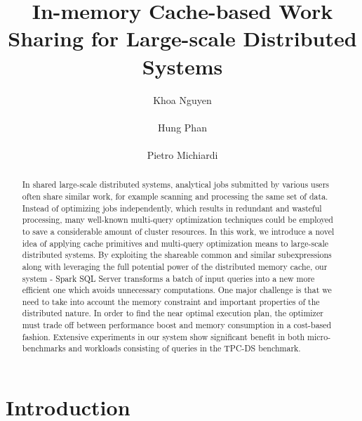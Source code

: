 \documentclass{acmsig}
\begin{document}
\title{In-memory Cache-based Work Sharing for Large-scale Distributed Systems}


\author{
\alignauthor
Khoa Nguyen\\
       \\
\alignauthor
Hung Phan\\
       \\
\alignauthor 
Pietro Michiardi
       \\
}
\maketitle

\begin{abstract}
In shared large-scale distributed systems, analytical jobs submitted by various users often share similar work, for example scanning and processing the same set of data. Instead of optimizing jobs independently, which results in redundant and wasteful processing, many well-known multi-query optimization techniques could be employed to save a considerable amount of cluster resources. In this work, we introduce a novel idea of applying cache primitives and multi-query optimization means to large-scale distributed systems. By exploiting the shareable common and similar subexpressions along with leveraging the full potential power of the distributed memory cache, our system - Spark SQL Server transforms a batch of input queries into a new more efficient one which avoids unnecessary computations. One major challenge is that we need to take into account the memory constraint and important properties of the distributed nature. In order to find the near optimal execution plan, the optimizer must trade off between performance boost and memory consumption in a cost-based fashion. Extensive experiments in our system show significant benefit in both micro-benchmarks and workloads consisting of queries in the TPC-DS benchmark.
\end{abstract}

\section{Introduction}
\label{sec:introduction}

\end{document}
